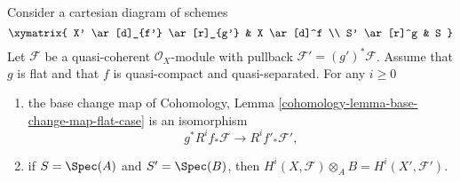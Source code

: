 \begin{lemma}
\label{lemma-flat-base-change-cohomology}
Consider a cartesian diagram of schemes
$$
\xymatrix{
X' \ar[d]_{f'} \ar[r]_{g'} & X \ar[d]^f \\
S' \ar[r]^g & S
}
$$
Let $\mathcal{F}$ be a quasi-coherent $\mathcal{O}_X$-module
with pullback $\mathcal{F}' = (g')^*\mathcal{F}$.
Assume that $g$ is flat and that $f$ is quasi-compact and quasi-separated.
For any $i \geq 0$
\begin{enumerate}
\item the base change map of
Cohomology, Lemma \ref{cohomology-lemma-base-change-map-flat-case}
is an isomorphism
$$
g^*R^if_*\mathcal{F} \longrightarrow R^if'_*\mathcal{F}',
$$
\item if $S = \Spec(A)$ and $S' = \Spec(B)$, then
$H^i(X, \mathcal{F}) \otimes_A B = H^i(X', \mathcal{F}')$.
\end{enumerate}
\end{lemma}

